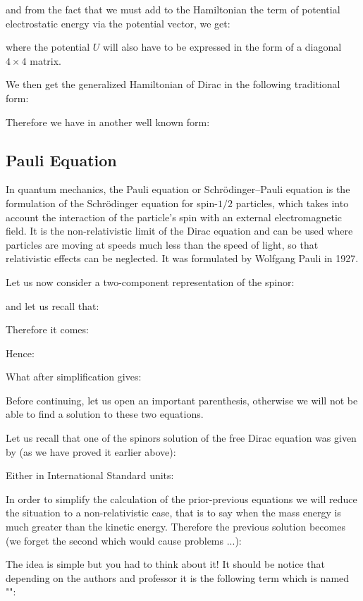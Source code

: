 	and from the fact that we must add to the Hamiltonian the term of potential electrostatic energy via the potential vector, we get:
	
	where the potential $U$ will also have to be expressed in the form of a diagonal $4\times 4$ matrix.

	We then get the generalized Hamiltonian of Dirac in the following traditional form:
	
	Therefore we have in another well known form:
	
	
	\pagebreak
	\subsection{Pauli Equation}
	In quantum mechanics, the Pauli equation or Schrödinger–Pauli equation is the formulation of the Schrödinger equation for spin-$1/2$ particles, which takes into account the interaction of the particle's spin with an external electromagnetic field. It is the non-relativistic limit of the Dirac equation and can be used where particles are moving at speeds much less than the speed of light, so that relativistic effects can be neglected. It was formulated by Wolfgang Pauli in 1927.
	
	Let us now consider a two-component representation of the spinor:
	
	and let us recall that:
	
	Therefore it comes:
	
	Hence:
	
	What after simplification gives:
	
	Before continuing, let us open an important parenthesis, otherwise we will not be able to find a solution to these two equations.

	Let us recall that one of the spinors solution of the free Dirac equation was given by (as we have proved it earlier above):
	
	Either in International Standard units:
	
	In order to simplify the calculation of the prior-previous equations we will reduce the situation to a non-relativistic case, that is to say when the mass energy is much greater than the kinetic energy. Therefore the previous solution becomes (we forget the second which would cause problems ...):
	
	The idea is simple but you had to think about it! It should be notice that depending on the authors and professor it is the following term which is named "":

